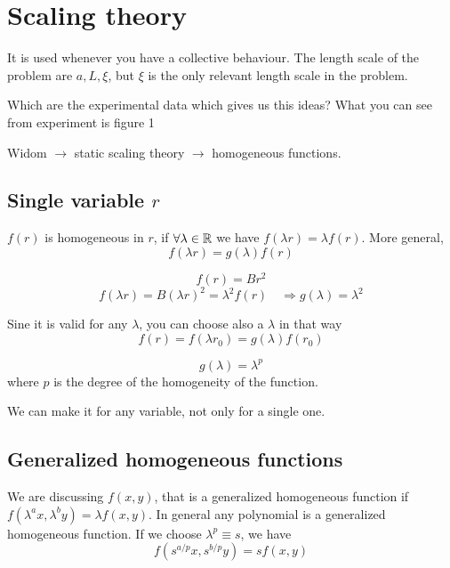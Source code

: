 \documentclass[../main/main.tex]{subfiles}
\begin{document}

\section{Scaling theory}
It is used whenever you have a collective behaviour. The length scale of the problem are \( a,L,\xi  \), but  \( \xi  \) is the only relevant length scale in the problem.

Which are the experimental data which gives us this ideas? What you can see from experiment is
figure 1

Widom \( \rightarrow  \) static scaling theory \( \rightarrow  \) homogeneous functions.

\subsection{Single variable \( r \) }
\( f(r) \) is homogeneous in \( r \), if \( \forall  \lambda  \in \mathbb{R} \) we have
\( f( \lambda r) = \lambda f(r) \). More general,
\begin{equation}
  f( \lambda r) = g (\lambda) f(r)
\end{equation}
\begin{example}
\begin{equation}
  f(r) = B r^2
\end{equation}
\begin{equation}
  f ( \lambda r) = B ( \lambda r)^2 = \lambda ^2 f (r) \quad \Rightarrow g ( \lambda ) = \lambda ^2
\end{equation}
\end{example}
Sine it is valid for any \( \lambda  \), you can choose also a \( \lambda  \) in that way
\begin{equation}
  f(r) = f (\lambda r_0) = g (\lambda ) f (r_0)
\end{equation}
\begin{theorem}[]
\begin{equation}
  g(\lambda ) = \lambda ^p
\end{equation}
where \( p \) is the degree of the homogeneity of the function.
\end{theorem}
We can make it for any variable, not only for a single one.

\subsection{Generalized homogeneous functions}
We are discussing \( f(x,y) \), that is a generalized homogeneous function if \( f (\lambda ^a x, \lambda ^b y) = \lambda f(x,y)\). In general any polynomial is a generalized homogeneous function.
If we choose \( \lambda ^p \equiv s \), we have
\begin{equation}
  f ( s^{a/p} x, s^{b/p} y) = s f(x,y)
\end{equation}
\end{document}
